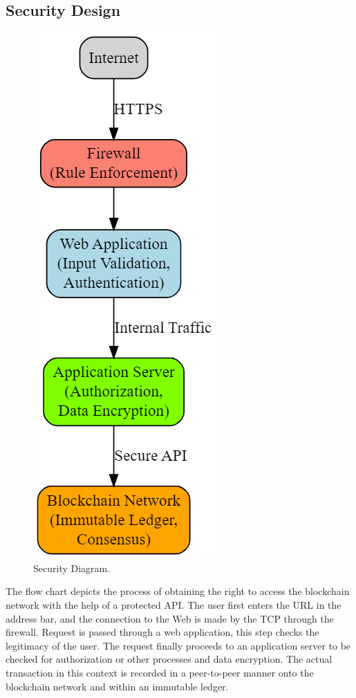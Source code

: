 \documentclass[conference]{IEEEtran}
\begin{document}
\subsection{Security Design}
    \begin{figure}[H]
        \centerline{\includegraphics[width=0.3\linewidth]{fig4.png}}
        \caption{Security Diagram.}
        \label{fig4}
    \end{figure}

The flow chart depicts the process of obtaining the right to access the blockchain network with the help of a protected API. The user first enters the URL in the address bar, and the connection to the Web is made by the TCP through the firewall. Request is passed through a web application, this step checks the legitimacy of the user. The request finally proceeds to an application server to be checked for authorization or other processes and data encryption. The actual transaction in this context is recorded in a peer-to-peer manner onto the blockchain network and within an immutable ledger.
\end{document}
